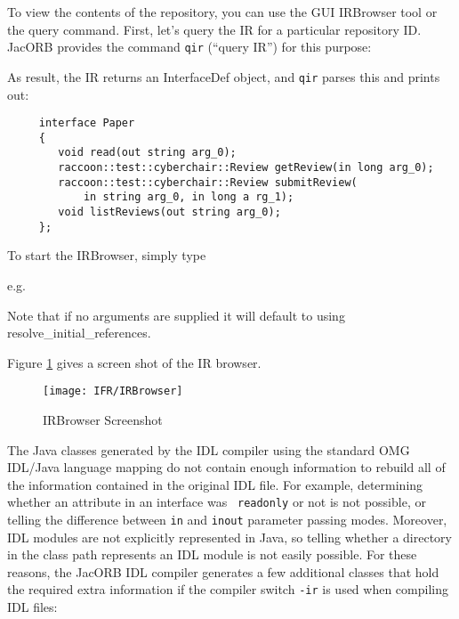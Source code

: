 To view the contents of the repository, you can use the GUI IRBrowser
tool or the query command. First, let's query the IR for a particular
repository ID. JacORB provides the command {\tt qir} (``query IR'')
for this purpose:


As result, the IR returns an InterfaceDef object, and {\tt qir} parses
this and prints out:

\begin{verbatim}
     interface Paper
     {
        void read(out string arg_0);
        raccoon::test::cyberchair::Review getReview(in long arg_0);
        raccoon::test::cyberchair::Review submitReview(
            in string arg_0, in long a rg_1);
        void listReviews(out string arg_0);
     };
\end{verbatim}

To start the IRBrowser, simply type


e.g.


Note that if no arguments are supplied it will default to using
resolve\_initial\_references.

Figure \ref{fig:IRBrowser} gives a screen shot of the IR browser.

\bigskip
\begin{figure}[htb]
  \begin{center}
    \texttt{[image: IFR/IRBrowser]}
\end{center}
\caption{IRBrowser Screenshot}
\label{fig:IRBrowser}
\end{figure}

The Java classes generated by  the IDL compiler using the standard OMG
IDL/Java language mapping do not contain enough information to rebuild
all  of the  information contained  in  the original  IDL file.   For
example,  determining whether an  attribute in  an interface  was {\tt
readonly} or  not is not  possible, or telling the  difference between
{\tt  in}  and {\tt  inout}  parameter  passing  modes. Moreover,  IDL
modules are not  explicitly represented in Java, so  telling whether a
directory in  the class  path represents an  IDL module is  not easily
possible. For these  reasons, the JacORB IDL compiler  generates a few
additional  classes that hold  the required  extra information  if the
compiler switch {\tt -ir} is used when compiling IDL files:

